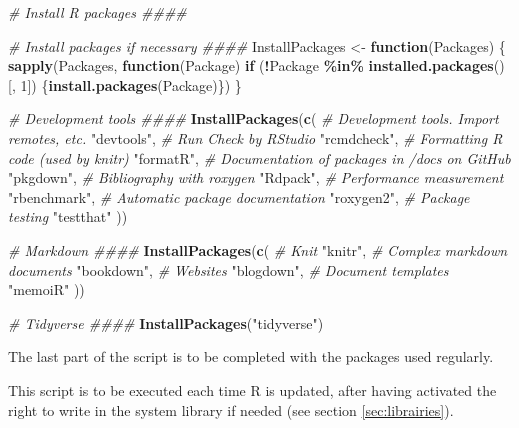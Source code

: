 \documentclass[
  12pt,
  american,
  a4paper,
  extrafontsizes,onecolumn,openright
  ]{memoir}
\newenvironment{Shaded}{\begin{snugshade}}{\end{snugshade}}
\newcommand{\CommentTok}[1]{\textcolor[rgb]{0.56,0.35,0.01}{\textit{#1}}}
\newcommand{\ControlFlowTok}[1]{\textcolor[rgb]{0.13,0.29,0.53}{\textbf{#1}}}
\newcommand{\DecValTok}[1]{\textcolor[rgb]{0.00,0.00,0.81}{#1}}
\newcommand{\FunctionTok}[1]{\textcolor[rgb]{0.13,0.29,0.53}{\textbf{#1}}}
\newcommand{\NormalTok}[1]{#1}
\newcommand{\OtherTok}[1]{\textcolor[rgb]{0.56,0.35,0.01}{#1}}
\newcommand{\SpecialCharTok}[1]{\textcolor[rgb]{0.81,0.36,0.00}{\textbf{#1}}}
\newcommand{\StringTok}[1]{\textcolor[rgb]{0.31,0.60,0.02}{#1}}
\newlength{\rf}
\begin{document}
\begin{Shaded}
\begin{Highlighting}[]
\CommentTok{\# Install R packages \#\#\#\#}

\CommentTok{\# Install packages if necessary \#\#\#\#}
\NormalTok{InstallPackages }\OtherTok{\textless{}{-}} \ControlFlowTok{function}\NormalTok{(Packages) \{}
  \FunctionTok{sapply}\NormalTok{(Packages, }\ControlFlowTok{function}\NormalTok{(Package) }
    \ControlFlowTok{if}\NormalTok{ (}\SpecialCharTok{!}\NormalTok{Package }\SpecialCharTok{\%in\%} \FunctionTok{installed.packages}\NormalTok{()[, }\DecValTok{1}\NormalTok{]) }
\NormalTok{      \{}\FunctionTok{install.packages}\NormalTok{(Package)\})}
\NormalTok{\}}


\CommentTok{\# Development tools \#\#\#\#}
\FunctionTok{InstallPackages}\NormalTok{(}\FunctionTok{c}\NormalTok{(}
  \CommentTok{\# Development tools. Import remotes, etc.}
  \StringTok{"devtools"}\NormalTok{,}
  \CommentTok{\# Run Check by RStudio}
  \StringTok{"rcmdcheck"}\NormalTok{,}
  \CommentTok{\# Formatting R code (used by knitr)}
  \StringTok{"formatR"}\NormalTok{,}
  \CommentTok{\# Documentation of packages in /docs on GitHub}
  \StringTok{"pkgdown"}\NormalTok{,}
  \CommentTok{\# Bibliography with roxygen}
  \StringTok{"Rdpack"}\NormalTok{,}
  \CommentTok{\# Performance measurement}
  \StringTok{"rbenchmark"}\NormalTok{,}
  \CommentTok{\# Automatic package documentation}
  \StringTok{"roxygen2"}\NormalTok{,}
  \CommentTok{\# Package testing}
  \StringTok{"testthat"}
\NormalTok{  ))}

\CommentTok{\# Markdown \#\#\#\#}
\FunctionTok{InstallPackages}\NormalTok{(}\FunctionTok{c}\NormalTok{(}
  \CommentTok{\# Knit}
  \StringTok{"knitr"}\NormalTok{,}
  \CommentTok{\# Complex markdown documents}
  \StringTok{"bookdown"}\NormalTok{,}
  \CommentTok{\# Websites}
  \StringTok{"blogdown"}\NormalTok{,}
  \CommentTok{\# Document templates}
  \StringTok{"memoiR"}
\NormalTok{  ))}

\CommentTok{\# Tidyverse \#\#\#\#}
\FunctionTok{InstallPackages}\NormalTok{(}\StringTok{"tidyverse"}\NormalTok{)}
\end{Highlighting}
\end{Shaded}

\normalsize

The last part of the script is to be completed with the packages used regularly.

This script is to be executed each time R is updated, after having activated the right to write in the system library if needed (see section \ref{sec:librairies}).
\end{document}
